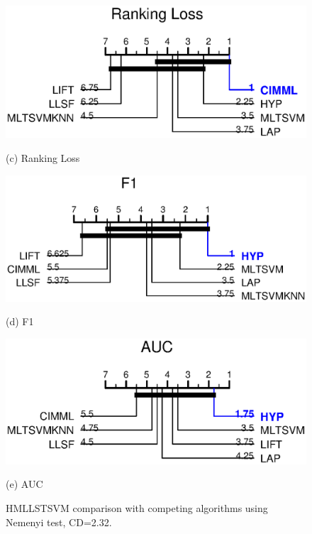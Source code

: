 \documentclass[12pt,a4paper,oneside,english]{report}
\begin{document}
\begin{figure}[!htbp]
    \begin{minipage}[t]{0.45\textwidth}
        \centering
        \includegraphics[width=\linewidth]{Figures/chp3/RL.eps}
        \caption*{(c) Ranking Loss}
        \label{figrl}
    \end{minipage}%
    \hspace{0.05\textwidth}
    \begin{minipage}[t]{0.45\textwidth}
        \centering
        \includegraphics[width=\linewidth]{Figures/chp3/F1.eps}
        \caption*{(d) F1}
        \label{figf1}
    \end{minipage}

    \vspace{0.5em}

    \begin{minipage}[t]{0.6\textwidth}
        \centering
        \includegraphics[width=\linewidth]{Figures/chp3/AUC.eps}
        \caption*{(e) AUC}
        \label{figauc}
    \end{minipage}

    \caption{HMLLSTSVM comparison with competing algorithms using Nemenyi test, CD=2.32.}
    \label{figcd}
\end{figure}
\end{document}
